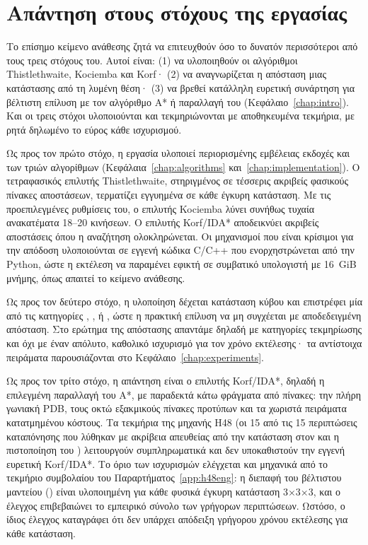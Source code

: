 \section{Απάντηση στους στόχους της εργασίας}
\label{sec:conclusions-goals}

Το επίσημο κείμενο ανάθεσης ζητά να επιτευχθούν όσο το δυνατόν περισσότεροι από τους τρεις στόχους του. Αυτοί είναι: (1) να υλοποιηθούν οι αλγόριθμοι Thistlethwaite, Kociemba και Korf· (2) να αναγνωρίζεται η απόσταση μιας κατάστασης από τη λυμένη θέση· (3) να βρεθεί κατάλληλη ευρετική συνάρτηση για βέλτιστη επίλυση με τον αλγόριθμο A* ή παραλλαγή του (Κεφάλαιο~\ref{chap:intro}). Και οι τρεις στόχοι υλοποιούνται και τεκμηριώνονται με αποθηκευμένα τεκμήρια, με ρητά δηλωμένο το εύρος κάθε ισχυρισμού.

Ως προς τον πρώτο στόχο, η εργασία υλοποιεί περιορισμένης εμβέλειας εκδοχές και των τριών αλγορίθμων (Κεφάλαια~\ref{chap:algorithms} και~\ref{chap:implementation}). Ο τετραφασικός επιλυτής Thistlethwaite, στηριγμένος σε τέσσερις ακριβείς φασικούς πίνακες αποστάσεων, τερματίζει εγγυημένα σε κάθε έγκυρη κατάσταση. Με τις προεπιλεγμένες ρυθμίσεις του, ο επιλυτής Kociemba λύνει συνήθως τυχαία ανακατέματα 18--20 κινήσεων. Ο επιλυτής Korf/IDA* αποδεικνύει ακριβείς αποστάσεις όπου η αναζήτηση ολοκληρώνεται. Οι μηχανισμοί που είναι κρίσιμοι για την απόδοση υλοποιούνται σε εγγενή κώδικα C/C++ που ενορχηστρώνεται από την Python, ώστε η εκτέλεση να παραμένει εφικτή σε συμβατικό υπολογιστή με 16~GiB μνήμης, όπως απαιτεί το κείμενο ανάθεσης.

Ως προς τον δεύτερο στόχο, η υλοποίηση δέχεται κατάσταση κύβου και επιστρέφει μία από τις κατηγορίες , ,  ή , ώστε η πρακτική επίλυση να μη συγχέεται με αποδεδειγμένη απόσταση. Στο ερώτημα της απόστασης απαντάμε δηλαδή με κατηγορίες τεκμηρίωσης και όχι με έναν απόλυτο, καθολικό ισχυρισμό για τον χρόνο εκτέλεσης· τα αντίστοιχα πειράματα παρουσιάζονται στο Κεφάλαιο~\ref{chap:experiments}.

Ως προς τον τρίτο στόχο, η απάντηση είναι ο επιλυτής Korf/IDA*, δηλαδή η επιλεγμένη παραλλαγή του A*, με παραδεκτά κάτω φράγματα από πίνακες: την πλήρη γωνιακή PDB, τους οκτώ εξακμικούς πίνακες προτύπων και τα χωριστά πειράματα κατατμημένου κόστους. Τα τεκμήρια της μηχανής H48 (οι 15 από τις 15 περιπτώσεις καταπόνησης που λύθηκαν με ακρίβεια απευθείας από την κατάσταση στον  και η πιστοποίηση του ) λειτουργούν συμπληρωματικά και δεν υποκαθιστούν την εγγενή ευρετική Korf/IDA*. Το όριο των ισχυρισμών ελέγχεται και μηχανικά από το τεκμήριο συμβολαίου του Παραρτήματος~\ref{app:h48eng}: η διεπαφή του βέλτιστου μαντείου () είναι υλοποιημένη για κάθε φυσικά έγκυρη κατάσταση 3×3×3, και ο έλεγχος επιβεβαιώνει το εμπειρικό σύνολο των γρήγορων περιπτώσεων. Ωστόσο, ο ίδιος έλεγχος καταγράφει ότι δεν υπάρχει απόδειξη γρήγορου χρόνου εκτέλεσης για κάθε κατάσταση.

